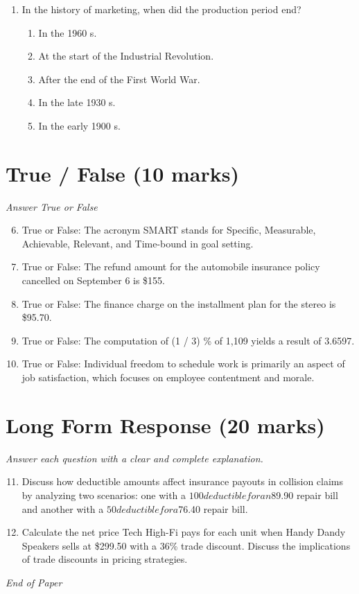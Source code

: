 \documentclass[12pt]{article}
\begin{document}
\begin{enumerate}[label=\arabic*.]
\begin{enumerate}[label=(\alph*)]
    \item Policy 1: $28.00, Policy 2: $491.00, Policy 3: \$117.00
    \item Policy 1: $25.20, Policy 2: $491.40, Policy 3: \$117.60
    \item Policy 1: $52.00, Policy 2: $182.00, Policy 3: \$117.60
\end{enumerate}
\item In the history of marketing, when did the production period end?
\begin{enumerate}[label=(\alph*)]
    \item In the 1960 s.
    \item At the start of the Industrial Revolution.
    \item After the end of the First World War.
    \item In the late 1930 s.
    \item In the early 1900 s.
\end{enumerate}
\end{enumerate}

\section*{True / False (10 marks)}
\textit{Answer True or False}
\begin{enumerate}[label=\arabic*.]
\setcounter{enumi}{5}
\item True or False: The acronym SMART stands for Specific, Measurable, Achievable, Relevant, and Time-bound in goal setting.
\item True or False: The refund amount for the automobile insurance policy cancelled on September 6 is \$155.
\item True or False: The finance charge on the installment plan for the stereo is \$95.70.
\item True or False: The computation of (1 / 3) \% of 1,109 yields a result of 3.6597.
\item True or False: Individual freedom to schedule work is primarily an aspect of job satisfaction, which focuses on employee contentment and morale.
\end{enumerate}

\section*{Long Form Response (20 marks)}
\textit{Answer each question with a clear and complete explanation.}
\begin{enumerate}[label=\arabic*.]
\setcounter{enumi}{10}
\item Discuss how deductible amounts affect insurance payouts in collision claims by analyzing two scenarios: one with a $100 deductible for an $89.90 repair bill and another with a $50 deductible for a $76.40 repair bill.
\item Calculate the net price Tech High-Fi pays for each unit when Handy Dandy Speakers sells at \$299.50 with a 36\% trade discount. Discuss the implications of trade discounts in pricing strategies.
\end{enumerate}

\vfill
\noindent\textit{End of Paper}
\end{document}
